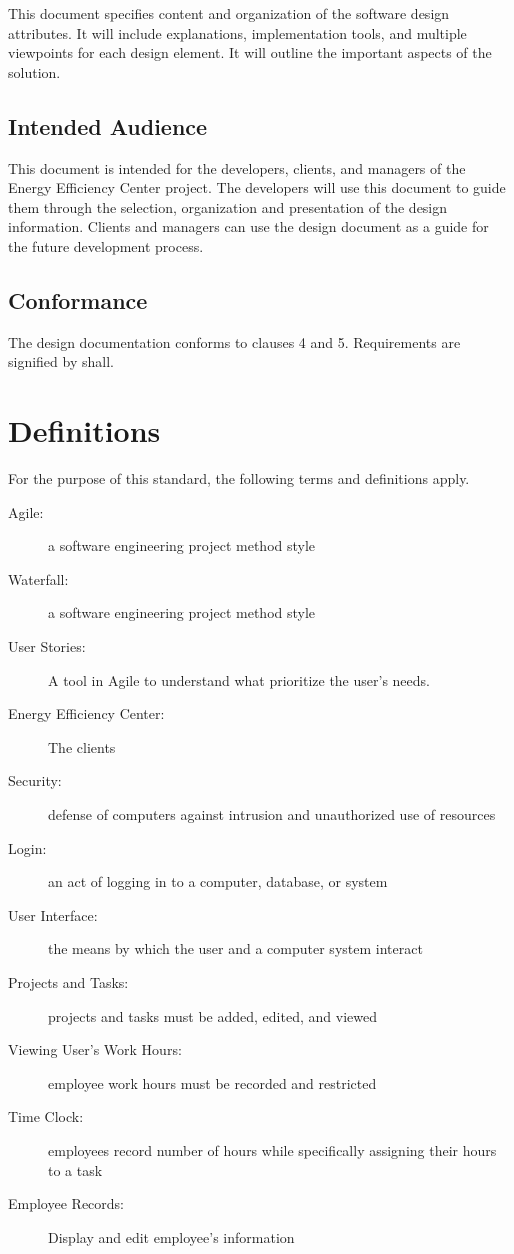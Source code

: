 \documentclass[letterpaper,10pt,titlepage,journal,compsoc,draftclsnofoot,onecolumn]{IEEEtran}
\begin{document}
This document specifies content and organization of  the software design attributes. It will include explanations, implementation tools, and multiple viewpoints for each design element. It will outline the important aspects of the solution. 

\subsection{Intended Audience}

This document is intended for the developers,  clients, and managers of the Energy Efficiency Center project. The developers will use this document to guide them through the selection, organization and presentation of the design information. Clients and managers can use the design document as a guide for the future development process.

\subsection{Conformance}

The design documentation conforms to clauses 4 and 5. Requirements are signified by shall. 

\section{Definitions}

For the purpose of this standard, the following terms and definitions apply.

\begin{description}
\item[Agile: ] a software engineering project method style
\item[Waterfall: ] a software engineering project method style
\item[User Stories: ] A tool in Agile to understand what prioritize the user's needs.
\item[Energy Efficiency Center: ] The clients
\item[Security:] defense of computers against intrusion and unauthorized use of resources
\item[Login:] an act of logging in to a computer, database, or system
\item[User Interface:] the means by which the user and a computer system interact
\item[Projects and Tasks:] projects and tasks must be added, edited, and viewed
\item[Viewing User's Work Hours:] employee work hours must be recorded and restricted 
\item[Time Clock: ] employees record number of hours while specifically assigning their hours to a task
\item[Employee Records:] Display and edit employee's information
\end{description}
\end{document}
